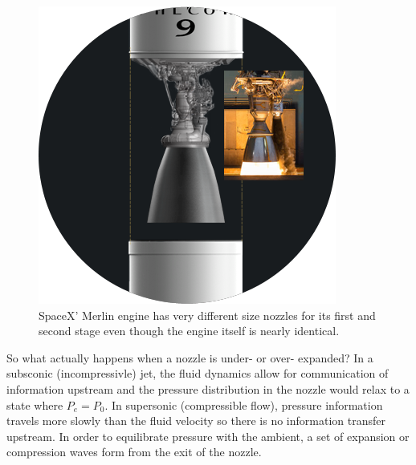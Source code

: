 \documentclass[twocolumn]{memoir} %
\begin{document}
\begin{figure}[H]
    \includegraphics[width=0.9\columnwidth]{merlin}
    \caption{SpaceX' Merlin engine has very different size nozzles for its first
    and second stage even though the engine itself is nearly identical.}
\end{figure}

So what actually happens when a nozzle is under- or over- expanded?  In a subsconic
(incompressivle) jet, the fluid dynamics allow for communication of information upstream
and the pressure distribution in the nozzle would relax to a state where $P_e = P_0$. 
In supersonic (compressible flow), pressure information travels more slowly than the fluid
velocity so there is no information transfer upstream.  In order to equilibrate pressure with
the ambient, a set of expansion or compression waves form from the exit of the nozzle.  
\end{document}
